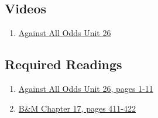 \documentclass[letterpaper,9pt,twocolumn,twoside,printwatermark=false]{pinp}
\providecommand{\tightlist}{%
  \setlength{\itemsep}{0pt}\setlength{\parskip}{0pt}}
\begin{document}
\subsection{Videos}\label{videos-1}

\begin{enumerate}
\def\labelenumi{\arabic{enumi}.}
\tightlist
\item
  \href{https://www.learner.org/courses/againstallodds/unitpages/unit26.html}{Against
  All Odds Unit 26}
\end{enumerate}

\subsection{Required Readings}\label{required-readings-2}

\begin{enumerate}
\item \href{https://www.learner.org/courses/againstallodds/pdfs/AgainstAllOdds_StudentGuide_Unit26.pdf#page=1}{Against All Odds Unit 26, pages 1-11}
\item \href{https://www.dropbox.com/s/qs58c54zh1kui4d/Ch17InferenceAboutPopulationMean.pdf?dl=0}{B\&M Chapter 17, pages 411-422}
\end{enumerate}





\end{document}

